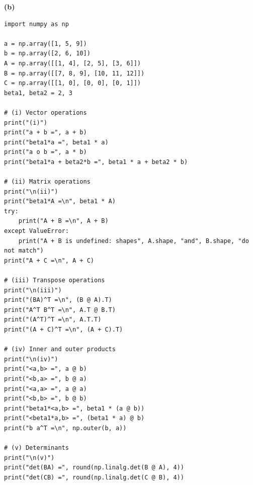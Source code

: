 \documentclass[11pt]{article}
\begin{document}
\textbf{(b)}
\begin{verbatim}
import numpy as np

a = np.array([1, 5, 9])
b = np.array([2, 6, 10])
A = np.array([[1, 4], [2, 5], [3, 6]])
B = np.array([[7, 8, 9], [10, 11, 12]])
C = np.array([[1, 0], [0, 0], [0, 1]])
beta1, beta2 = 2, 3

# (i) Vector operations
print("(i)")
print("a + b =", a + b)
print("beta1*a =", beta1 * a)
print("a o b =", a * b)
print("beta1*a + beta2*b =", beta1 * a + beta2 * b)

# (ii) Matrix operations
print("\n(ii)")
print("beta1*A =\n", beta1 * A)
try:
    print("A + B =\n", A + B)
except ValueError:
    print("A + B is undefined: shapes", A.shape, "and", B.shape, "do not match")
print("A + C =\n", A + C)

# (iii) Transpose operations
print("\n(iii)")
print("(BA)^T =\n", (B @ A).T)
print("A^T B^T =\n", A.T @ B.T)
print("(A^T)^T =\n", A.T.T)
print("(A + C)^T =\n", (A + C).T)

# (iv) Inner and outer products
print("\n(iv)")
print("<a,b> =", a @ b)
print("<b,a> =", b @ a)
print("<a,a> =", a @ a)
print("<b,b> =", b @ b)
print("beta1*<a,b> =", beta1 * (a @ b))
print("<beta1*a,b> =", (beta1 * a) @ b)
print("b a^T =\n", np.outer(b, a))

# (v) Determinants
print("\n(v)")
print("det(BA) =", round(np.linalg.det(B @ A), 4))
print("det(CB) =", round(np.linalg.det(C @ B), 4))
\end{verbatim}
\end{document}

